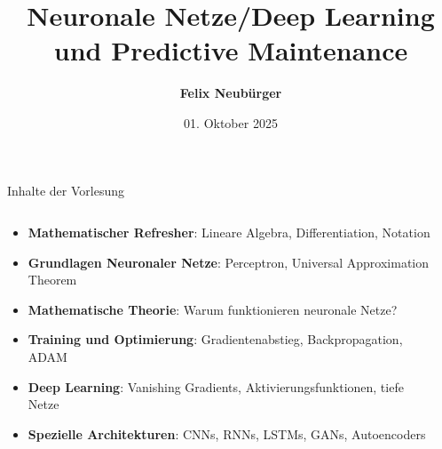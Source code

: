 \documentclass[aspectratio=1610, xcolor=dvipsnames, 9pt]{beamer}
\title{Neuronale Netze/Deep Learning und Predictive Maintenance}
\author[F.~Neubürger,]{ \textbf{Felix Neubürger}}
\institute[I \& W]{Fachhochschule Südwestfalen, Ingenieurs- \& Wirtschaftswissenschaften}
\date{01. Oktober 2025}
\begin{document}
\begin{frame}{Inhalte der Vorlesung}
  \begin{columns}
    \begin{column}{1\textwidth}
      \begin{itemize}
        \item \textbf{Mathematischer Refresher}: Lineare Algebra, Differentiation, Notation \newline
        \item \textbf{Grundlagen Neuronaler Netze}: Perceptron, Universal Approximation Theorem \newline
        \item \textbf{Mathematische Theorie}: Warum funktionieren neuronale Netze? \newline
        \item \textbf{Training und Optimierung}: Gradientenabstieg, Backpropagation, ADAM \newline
        \item \textbf{Deep Learning}: Vanishing Gradients, Aktivierungsfunktionen, tiefe Netze \newline
        \item \textbf{Spezielle Architekturen}: CNNs, RNNs, LSTMs, GANs, Autoencoders \newline

      \end{itemize}
    \end{column}
    \begin{column}{0\textwidth}
    \end{column}
  \end{columns}
\end{frame}
\end{document}

